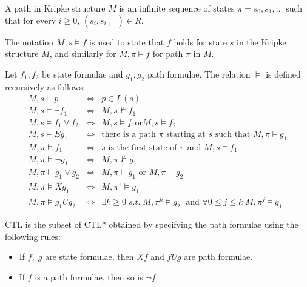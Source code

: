 \documentclass[11pt]{article}
\begin{document}
    \begin{definition}
        A path in Kripke structure $M$ is an infinite sequence of states 
        $\pi = s_0,s_1,\dots$ such that for every $i\geq 0$, 
        $(s_i, s_{i+1})\in R$.
    \end{definition}

    The notation $M, s \models f$ is used to state that $f$ holds for state
    $s$ in the Kripke structure $M$, and similarly for $M, \pi \models f$ for
    path $\pi$ in $M$.

    \begin{definition}
        Let $f_1, f_2$ be state formulae and $g_1, g_2$ path formulae. 
        The relation $\models$ is defined recursively as follows:
        \begin{eqnarray}
            M,s \models p &\iff & p\in L(s) \\
            M,s \models \neg f_1 &\iff &M,s \not\models f_1 \\
            M,s \models f_1 \vee f_2 &\iff & M,s \models f_1 \text{or} M,s \models f_2 \\
            M,s \models Eg_1 &\iff &\text{there is a path $\pi$ starting at $s$ such
            that $M, \pi \models g_1$}\\
            M, \pi \models f_1 &\iff & s \text{ is the first state of $\pi$ and }
            M,s \models f_1 \\
            M, \pi \models \neg g_1 &\iff &M,\pi \not\models g_1\\
            M,\pi \models g_1 \vee g_2 &\iff & M,\pi \models g_1 \text{ or } M,\pi \models g_2 \\
            M, \pi \models Xg_1 &\iff &M,\pi^1 \models g_1\\
            M,\pi \models g_1Ug_2 &\iff &\exists k\geq 0\; s.t.\; M,\pi^k\models g_2\;
            \text{ and } \forall 0\leq j\leq k\; M,\pi^j \models g_1
        \end{eqnarray}
    \end{definition}

    \begin{definition}
        CTL is the subset of CTL* obtained by specifying the path formulae using
        the following rules\cite{ltl}:
        \begin{itemize}
            \item
                If $f,\;g$ are state formulae, then $Xf$ and $fUg$ are path
                formulae.
            \item
                If $f$ is a path formulae, then so is $\neg f$.
        \end{itemize}
    \end{definition}
\end{document}
